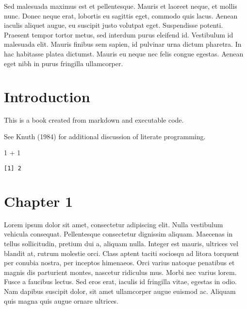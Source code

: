 \documentclass[
  12pt,
  letterpaper,
  oneside,
  open=any]{scrbook}
\newenvironment{Shaded}{\begin{snugshade}}{\end{snugshade}}
\newcommand{\DecValTok}[1]{\textcolor[rgb]{0.68,0.00,0.00}{#1}}
\newcommand{\SpecialCharTok}[1]{\textcolor[rgb]{0.37,0.37,0.37}{#1}}
\begin{document}
Sed malesuada maximus est et pellentesque. Mauris et laoreet neque, et
mollis nunc. Donec neque erat, lobortis eu sagittis eget, commodo quis
lacus. Aenean iaculis aliquet augue, eu suscipit justo volutpat eget.
Suspendisse potenti. Praesent tempor tortor metus, sed interdum purus
eleifend id. Vestibulum id malesuada elit. Mauris finibus sem sapien, id
pulvinar urna dictum pharetra. In hac habitasse platea dictumst. Mauris
eu neque nec felis congue egestas. Aenean eget nibh in purus fringilla
ullamcorper.

\tableofcontents
\listoftables
\listoffigures


\hypertarget{introduction}{%
\chapter{Introduction}\label{introduction}}


This is a book created from markdown and executable code.

See Knuth (1984) for additional discussion of literate programming.

\begin{Shaded}
\begin{Highlighting}[]
\DecValTok{1} \SpecialCharTok{+} \DecValTok{1}
\end{Highlighting}
\end{Shaded}

\begin{verbatim}
[1] 2
\end{verbatim}


\hypertarget{chapter-1}{%
\chapter{Chapter 1}\label{chapter-1}}

Lorem ipsum dolor sit amet, consectetur adipiscing elit. Nulla
vestibulum vehicula consequat. Pellentesque consectetur dignissim
aliquam. Maecenas in tellus sollicitudin, pretium dui a, aliquam nulla.
Integer est mauris, ultrices vel blandit at, rutrum molestie orci. Class
aptent taciti sociosqu ad litora torquent per conubia nostra, per
inceptos himenaeos. Orci varius natoque penatibus et magnis dis
parturient montes, nascetur ridiculus mus. Morbi nec varius lorem. Fusce
a faucibus lectus. Sed eros erat, iaculis id fringilla vitae, egestas in
odio. Nam dapibus suscipit dolor, sit amet ullamcorper augue euismod ac.
Aliquam quis magna quis augue ornare ultrices.
\end{document}

